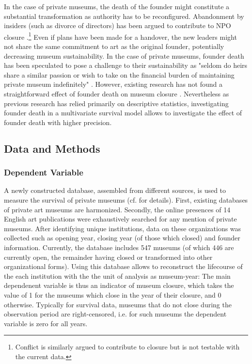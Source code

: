 \documentclass[12pt]{article}
\begin{document}
In the case of private museums, the death of the founder might constitute a substantial transformation as authority has to be reconfigured.
Abandonment by insiders (such as divorce of directors) has been argued to contribute to NPO closure \parencite{Duckles_Hager_Galaskiewicz_2005_close}.\footnote{Conflict is similarly argued to contribute to closure but is not testable with the current data.}
Even if plans have been made for a handover, the new leaders might not share the same commitment to art as the original founder, potentially decreasing museum sustainability. 
In the case of private museums, founder death has been speculated to pose a challenge to their sustainability as "seldom do heirs share a similar passion or wish to take on the financial burden of maintaining private museum indefinitely" \parencite[p.234]{Walker_2019_collector}.
However, existing research has not found a straightforward effect of founder death on museum closure \parencite{Velthuis_Gera_forthcoming_fragility,Velthuis_etal_2023_boom}.
Nevertheless as previous research has relied primarily on descriptive statistics, investigating founder death in a multivariate survival model allows to investigate the effect of founder death with higher precision.
\bigbreak
\noindent





\subsection*{Data and Methods}


\subsubsection*{Dependent Variable}

A newly constructed database, assembled from different sources,  is used to measure the survival of private museums (cf. \textcite{Velthuis_etal_2023_boom} for details).
First, existing databases of private art museums are harmonized.
Secondly, the online presences of 14 English art publications were exhaustively searched for any mention of private museums.
After identifying unique institutions, data on these organizations was collected such as opening year, closing year (of those which closed) and founder information.
Currently, the database includes 547 museums (of which 446 are currently open, the remainder having closed or transformed into other organizational forms).
Using this database allows to reconstruct the lifecourse of the each institution with the the unit of analysis as museum-year:
The main dependenent variable is thus an indicator of museum closure, which takes the value of 1 for the museums which close in the year of their closure, and 0 otherwise.
Typically for survival data, museums that do not close during the observation period are right-censored, i.e. for such museums the dependent variable is zero for all years.
\end{document}
